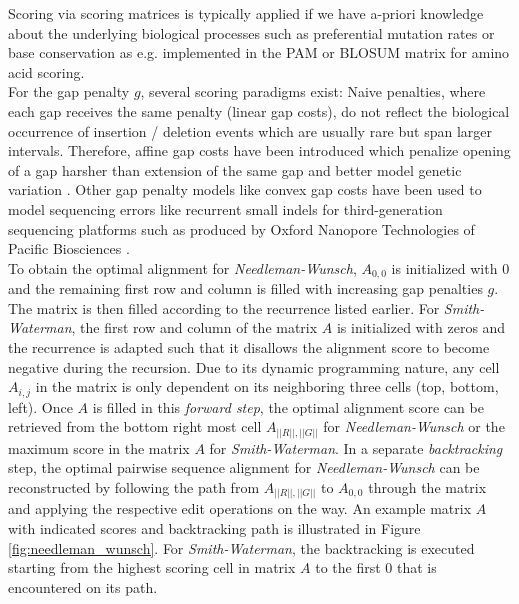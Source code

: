 Scoring via scoring matrices is typically applied if we have a-priori knowledge about the underlying biological processes such as preferential mutation rates or base conservation as e.g. implemented in the PAM \citep{Dayhoff78chapter22:} or BLOSUM matrix \citep{Henikoff1992} for amino acid scoring. \\
For the gap penalty $g$, several scoring paradigms exist: Naive penalties, where each gap receives the same penalty (linear gap costs), do not reflect the biological occurrence of insertion / deletion events which are usually rare but span larger intervals. Therefore, affine gap costs have been introduced which penalize opening of a gap harsher than extension of the same gap and better model genetic variation \citep{Knuth1997}. Other gap penalty models like convex gap costs have been used to model sequencing errors like recurrent small indels for third-generation sequencing platforms such as produced by Oxford Nanopore Technologies of Pacific Biosciences \citep{Sedlazeck2018}. \\
To obtain the optimal alignment for \textit{Needleman-Wunsch}, $A_{0,0}$ is initialized with $0$ and the remaining first row and column is filled with increasing gap penalties $g$. The matrix is then filled according to the recurrence listed earlier. For \textit{Smith-Waterman}, the first row and column of the matrix $A$ is initialized with zeros and the recurrence is adapted such that it disallows the alignment score to become negative during the recursion. Due to its dynamic programming nature, any cell $A_{i,j}$ in the matrix is only dependent on its neighboring three cells (top, bottom, left). Once $A$ is filled in this \textit{forward step}, the optimal alignment score can be retrieved from the bottom right most cell $A_{||R||,||G||}$ for \textit{Needleman-Wunsch} or the maximum score in the matrix $A$ for \textit{Smith-Waterman}. In a separate \textit{backtracking} step, the optimal pairwise sequence alignment for \textit{Needleman-Wunsch} can be reconstructed by following the path from $A_{||R||,||G||}$ to $A_{0,0}$ through the matrix and applying the respective edit operations on the way. An example matrix $A$ with indicated scores and backtracking path is illustrated in Figure \ref{fig:needleman_wunsch}. For \textit{Smith-Waterman}, the backtracking is executed starting from the highest scoring cell in matrix $A$ to the first 0 that is encountered on its path.

